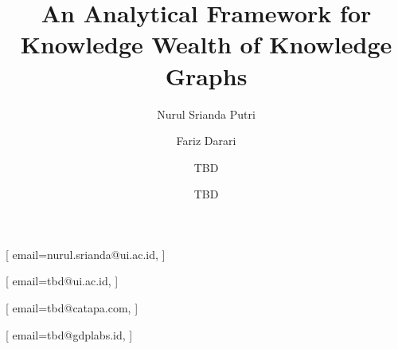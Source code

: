 \documentclass[
]{ceurart}
\begin{document}


\title{An Analytical Framework for Knowledge Wealth of Knowledge Graphs}


\author[1]{Nurul Srianda Putri}[%
email=nurul.srianda@ui.ac.id,
]
\author[1]{Fariz Darari}[%
email=tbd@ui.ac.id,
]
\address[1]{Faculty of Computer Science, Universitas Indonesia, Depok, Indonesia}

\author[2]{TBD}[%
email=tbd@catapa.com,
]
\address[2]{CATAPA, Jakarta, Indonesia}

\author[3]{TBD}[%
email=tbd@gdplabs.id,
]
\address[3]{GDP Labs, Jakarta, Indonesia}

\end{document}
